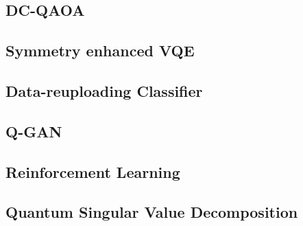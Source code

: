 \subsection{DC-QAOA}


\subsection{Symmetry enhanced VQE}


\subsection{Data-reuploading Classifier}


\subsection{Q-GAN}


\subsection{Reinforcement Learning}


\subsection{Quantum Singular Value Decomposition}

